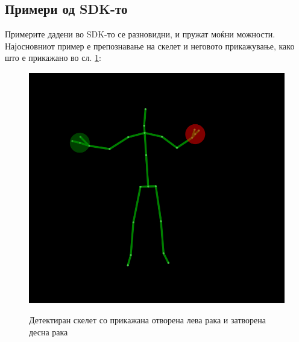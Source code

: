 \documentclass[11pt]{article}
\begin{document}
  \subsection{Примери од SDK-то}
     Примерите дадени во SDK-то се разновидни, и пружат моќни можности. Најосновниот пример е препознавање на скелет и неговото прикажување, како што е прикажано во сл. \ref{fig:shrug}:
     \begin{figure}[h]
      \begin{minipage}{0.65\linewidth}
        \centering
        \includegraphics[width =\textwidth]{./images/shrug_for_windows.png}
        \label{fig:shrug}
        \caption{Детектиран скелет со прикажана отворена лева рака и затворена десна рака}
      \end{minipage}
      \begin{minipage}{0.3\linewidth}
        \centering

\end{minipage}
\end{figure}
\end{document}
